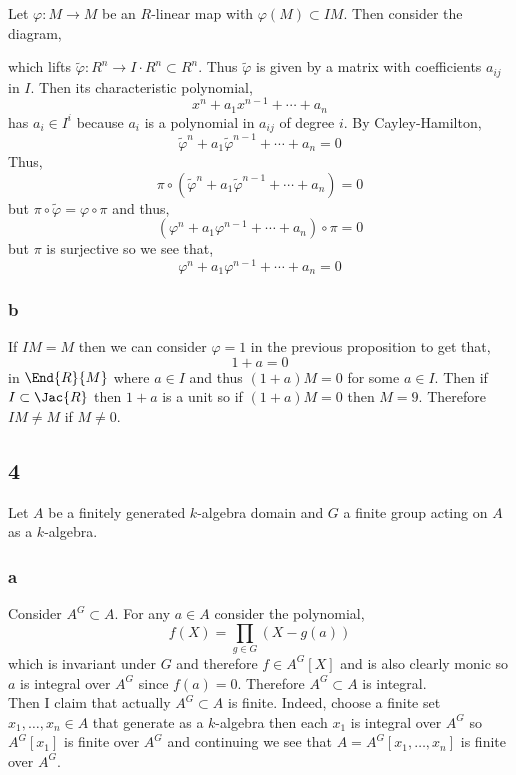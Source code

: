 \documentclass[12pt]{article}
\begin{document}
Let $\varphi : M \to M$ be an $R$-linear map with $\varphi(M) \subset I M$. Then consider the diagram,
\begin{center}
\end{center}
which lifts $\tilde{\varphi} : R^n \to I \cdot R^n \subset R^n$. Thus $\tilde{\varphi}$ is given by a matrix with coefficients $a_{ij}$ in $I$. Then its characteristic polynomial,
\[ x^n + a_1 x^{n-1} + \cdots + a_n \]
has $a_i \in I^i$ because $a_i$ is a polynomial in $a_{ij}$ of degree $i$. By Cayley-Hamilton,
\[ \tilde{\varphi}^n + a_1 \tilde{\varphi}^{n-1} + \cdots + a_n = 0 \]
Thus,
\[ \pi \circ (\tilde{\varphi}^n + a_1 \tilde{\varphi}^{n-1} + \cdots + a_n) = 0 \]
but $\pi \circ \tilde{\varphi} = \varphi \circ \pi$ and thus,
\[ (\varphi^n + a_1 \varphi^{n-1} + \cdots + a_n) \circ \pi = 0 \]
but $\pi$ is surjective so we see that,
\[ \varphi^n + a_1 \varphi^{n-1} + \cdots + a_n = 0 \]

\subsubsection{b}

If $IM = M$ then we can consider $\varphi = 1$ in the previous proposition to get that,
\[ 1 + a = 0 \]
in $\End{R}{M}$ where $a \in I$ and thus $(1 + a) M = 0$ for some $a \in I$. Then if $I \subset \Jac{R}$ then $1 + a$ is a unit so if $(1 + a) M = 0$ then $M = 9$. Therefore $I M \neq M$ if $M \neq 0$.

\subsection{4}

Let $A$ be a finitely generated $k$-algebra domain and $G$ a finite group acting on $A$ as a $k$-algebra.

\subsubsection{a}

Consider $A^G \subset A$. For any $a \in A$ consider the polynomial,
\[ f(X) = \prod_{g \in G} (X - g(a)) \]
which is invariant under $G$ and therefore $f \in A^G[X]$ and is also clearly monic so $a$ is integral over $A^G$ since $f(a) = 0$. Therefore $A^G \subset A$ is integral.
\bigskip\\
Then I claim that actually $A^G \subset A$ is finite. Indeed, choose a finite set $x_1, \dots, x_n \in A$ that generate as a $k$-algebra then each $x_1$ is integral over $A^G$ so $A^G[x_1]$ is finite over $A^G$ and continuing we see that $A = A^G[x_1, \dots, x_n]$ is finite over $A^G$.
\end{document}
